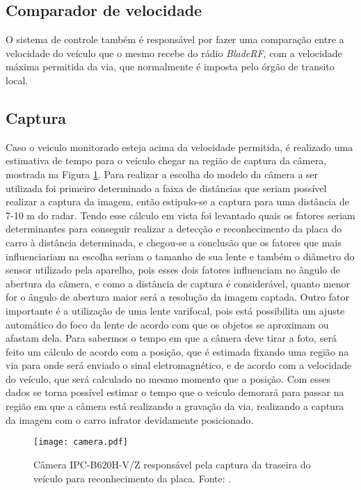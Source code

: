    \subsection{Comparador de velocidade}
    O sistema de controle também é responsável por fazer uma comparação entre a velocidade do veículo que o mesmo recebe do rádio \emph{BladeRF}, com a velocidade máxima permitida da via, que normalmente é imposta pelo órgão de transito local.
    \subsection{Captura}
    Caso o veiculo monitorado esteja acima da velocidade permitida, é realizado uma estimativa de tempo para o veículo chegar na região de captura da câmera, mostrada na Figura \ref{camera}.
    Para realizar a escolha do modelo da câmera a ser utilizada foi primeiro determinado a faixa de distâncias que seriam possível realizar a captura da imagem, então estipulo-se a captura para uma distância de 7-10 m do radar. Tendo esse cálculo em vista foi levantado quais os fatores seriam determinantes para conseguir realizar a detecção e reconhecimento da placa do carro à distância determinada, e chegou-se a conclusão que os fatores que mais influenciariam na escolha seriam o tamanho de sua lente e também o diâmetro do sensor utilizado pela aparelho, pois esses dois fatores influenciam no ângulo de abertura da câmera, e como a distância de captura é considerável, quanto menor for o ângulo de abertura maior será a resolução da imagem captada. Outro fator importante é a utilização de uma lente varifocal, pois está possibilita um ajuste automático do foco da lente de acordo com que os objetos se aproximam ou afastam dela. 
    Para sabermos o tempo em que a câmera deve tirar a foto, será feito um cálculo de acordo com a posição, que é estimada fixando uma região na via para onde será enviado o sinal eletromagnético, e de acordo com a velocidade do veículo, que  será calculado no mesmo momento que a posição. Com esses dados se torna possível estimar o tempo que o veiculo demorará para passar na região em que a câmera está realizando a gravação da via, realizando a captura da imagem com o carro infrator devidamente posicionado.
    \begin{figure}[H]
    \centering
    \texttt{[image: camera.pdf]}
    \caption{Câmera IPC-B620H-V/Z responsável pela captura da traseira do veículo para reconhecimento da placa. Fonte: \cite{camera}.}
    \label{camera}
\end{figure}
